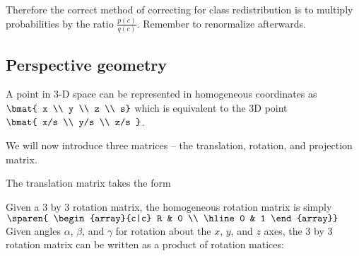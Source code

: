 \documentclass[12pt]{article}
\newcommand{\nec}[1]{\newcommand{#1}}
\begin{document}
Therefore the correct method of correcting for class redistribution is to multiply probabilities by the ratio $\frac{p(c)}{q(c)}$. Remember to renormalize afterwards.

\subsection{Perspective geometry}

A point in 3-D space can be represented in homogeneous coordinates as $\bmat{ x \\ y \\ z \\ s}$ which is equivalent to the 3D point $\bmat{ x/s \\ y/s \\ z/s }$.

We will now introduce three matrices -- the translation, rotation, and projection matrix.

The translation matrix takes the form


Given a 3 by 3 rotation matrix, the homogeneous rotation matrix is simply $\sparen{ \begin{array}{c|c} R & 0 \\ \hline 0 & 1 \end{array}}$
Given angles $\alpha$, $\beta$, and $\gamma$ for rotation about the $x$, $y$, and $z$ axes, the 3 by 3 rotation matrix can be written as a product of rotation matices:

\nec{\calpha}{\cos(\alpha)}
\nec{\salpha}{\sin(\alpha)}
\nec{\cbeta}{\cos(\beta)}
\nec{\sbeta}{\sin(\beta)}
\nec{\cgamma}{\cos(\gamma)}
\nec{\sgamma}{\sin(\gamma)}
\end{document}
